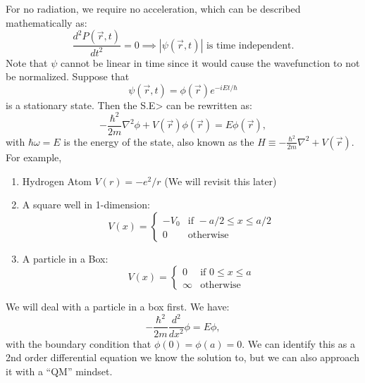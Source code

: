 \documentclass{article}
\numberwithin{equation}{section}
\begin{document}
For no radiation, we require no acceleration, which can be described mathematically as:
\begin{equation*}
    \frac{d^2 P(\vec{r},t)}{dt^2} = 0 \implies |\psi(\vec{r},t)|\text{ is time independent.}
\end{equation*}
Note that $\psi$ cannot be linear in time since it would cause the wavefunction to not be normalized. Suppose that 
\begin{equation*}
    \psi(\vec{r},t) = \phi(\vec{r})e^{-iEt/\hbar}
\end{equation*}
is a stationary state. Then the S.E> can be rewritten as:
\begin{equation*}
    -\frac{\hbar^2}{2m}\nabla^2\phi + V(\vec{r})\phi(\vec{r}) = E\phi(\vec{r}),
\end{equation*}
with $\hbar\omega = E$ is the energy of the state, also known as the  $H \equiv -\frac{\hbar^2}{2m}\nabla^2 + V(\vec{r}).$ For example,
\begin{enumerate}[label=(\alph*)]
    \item Hydrogen Atom $V(r) = -e^2/r$ (We will revisit this later)
    \item A square well in 1-dimension:
    \begin{equation*}
        V(x) = \begin{cases}
            -V_0 & \text{if } -a/2 \le x \le a/2 \\
            0 & \text{otherwise}
        \end{cases}
    \end{equation*}
    \item A particle in a Box:
    \begin{equation*}
        V(x) = \begin{cases}
            0 & \text{if } 0 \le x \le a \\
            \infty & \text{otherwise}
        \end{cases}
    \end{equation*}
\end{enumerate}
We will deal with a particle in a box first. We have:
\begin{equation*}
    -\frac{\hbar^2}{2m}\frac{d^2}{dx^2}\phi = E\phi,
\end{equation*}
with the boundary condition that $\phi(0)= \phi(a)=0.$ We can identify this as a 2nd order differential equation we know the solution to, but we can also approach it with a ``QM'' mindset.
\end{document}
